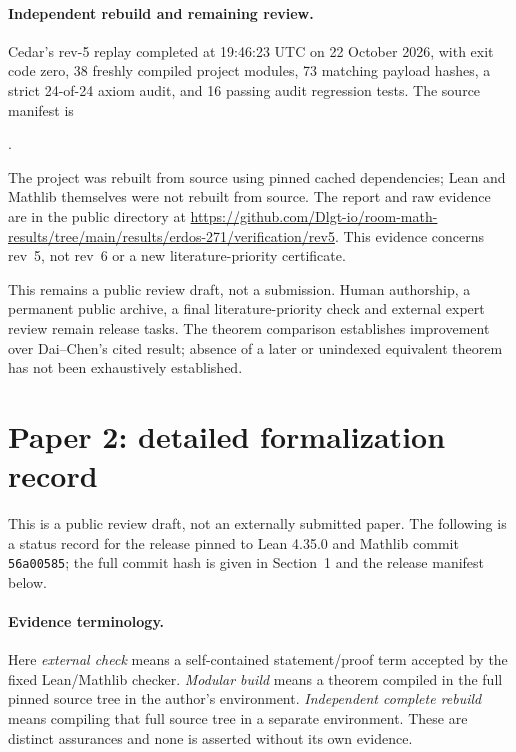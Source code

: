 \documentclass[11pt]{article}
\begin{document}
\paragraph{Independent rebuild and remaining review.}
Cedar's rev-5 replay completed at 19:46:23 UTC on 22 October 2026, with exit
code zero, 38 freshly compiled project modules, 73 matching payload hashes,
a strict 24-of-24 axiom audit, and 16 passing audit regression tests.
The source manifest is
\par\noindent{}.\par
The project was rebuilt from source using pinned cached dependencies; Lean and
Mathlib themselves were not rebuilt from source. The report and raw evidence are
in the public  directory at
\url{https://github.com/Dlgt-io/room-math-results/tree/main/results/erdos-271/verification/rev5}.
This evidence concerns rev~5, not rev~6 or a new literature-priority
certificate.

This remains a public review draft, not a submission. Human authorship,
a permanent public archive, a final literature-priority check and external expert
review remain release tasks. The theorem comparison establishes improvement
over Dai--Chen's cited result; absence of a later or unindexed equivalent theorem
has not been exhaustively established.


\section{Paper 2: detailed formalization record}
This is a public review draft, not an externally submitted paper. The following is a status record for the release pinned to Lean 4.35.0 and Mathlib commit \texttt{56a00585}; the full commit hash is given in Section~1 and the release manifest below.

\paragraph{Evidence terminology.}
Here \emph{external check} means a self-contained statement/proof term accepted by the fixed Lean/Mathlib checker. \emph{Modular build} means a theorem compiled in the full pinned source tree in the author's environment. \emph{Independent complete rebuild} means compiling that full source tree in a separate environment. These are distinct assurances and none is asserted without its own evidence.
\end{document}
